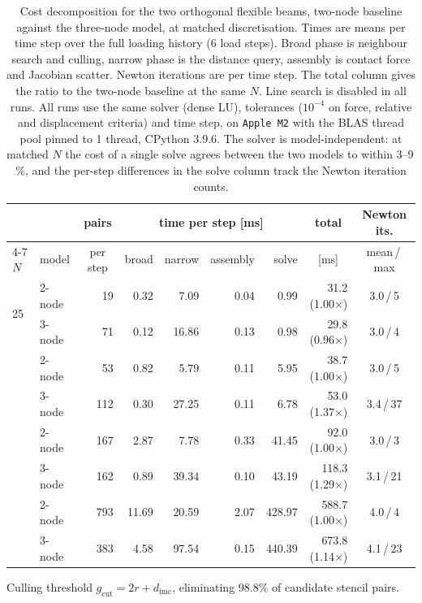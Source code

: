 \begin{table}[t]
\caption{Cost decomposition for the two orthogonal flexible beams, two-node
baseline against the three-node model, at matched discretisation. Times are
means per time step over the full loading history (6 load steps).
Broad phase is neighbour search and culling, narrow phase is the distance
query, assembly is contact force and Jacobian scatter. Newton iterations are
per time step. The total column gives the ratio to the two-node baseline at
the same $N$. Line search is disabled in all runs. All runs use the same
solver (dense LU), tolerances ($10^{-4}$ on force, relative and displacement
criteria) and time step, on \texttt{Apple M2} with the BLAS thread pool pinned
to 1 thread, CPython 3.9.6. The solver is
model-independent: at matched $N$ the cost of a single solve agrees between
the two models to within 3--9\,\%, and the per-step differences in the solve
column track the Newton iteration counts.}
\label{tab:cost}
\setlength{\tabcolsep}{8pt}
\begin{tabular}{@{}llrrrrrrc@{}}
\toprule
 & & \multicolumn{1}{c}{pairs} & \multicolumn{4}{c}{time per step [ms]}
 & \multicolumn{1}{c}{total} & \multicolumn{1}{c}{Newton its.} \\
\cmidrule(lr){4-7}
$N$ & model & \multicolumn{1}{c}{per step} & broad & narrow & assembly & solve
 & \multicolumn{1}{c}{[ms]} & \multicolumn{1}{c}{mean\,/\,max} \\
\midrule
\multirow{2}{*}{25} & 2-node & 19 & 0.32 & 7.09 & 0.04 & 0.99 & 31.2 (1.00$\times$) & 3.0\,/\,5 \\
 & 3-node & 71 & 0.12 & 16.86 & 0.13 & 0.98 & 29.8 (0.96$\times$) & 3.0\,/\,4 \\
\addlinespace
\multirow{2}{*}{50} & 2-node & 53 & 0.82 & 5.79 & 0.11 & 5.95 & 38.7 (1.00$\times$) & 3.0\,/\,5 \\
 & 3-node & 112 & 0.30 & 27.25 & 0.11 & 6.78 & 53.0 (1.37$\times$) & 3.4\,/\,37 \\
\addlinespace
\multirow{2}{*}{100} & 2-node & 167 & 2.87 & 7.78 & 0.33 & 41.45 & 92.0 (1.00$\times$) & 3.0\,/\,3 \\
 & 3-node & 162 & 0.89 & 39.34 & 0.10 & 43.19 & 118.3 (1.29$\times$) & 3.1\,/\,21 \\
\addlinespace
\multirow{2}{*}{200} & 2-node & 793 & 11.69 & 20.59 & 2.07 & 428.97 & 588.7 (1.00$\times$) & 4.0\,/\,4 \\
 & 3-node & 383 & 4.58 & 97.54 & 0.15 & 440.39 & 673.8 (1.14$\times$) & 4.1\,/\,23 \\
\bottomrule
\end{tabular}

\vspace{2pt}
\footnotesize Culling threshold $g_{\mathrm{cut}} = 2r + d_{\mathrm{imc}}$,
eliminating 98.8\% of candidate stencil pairs.
\end{table}
